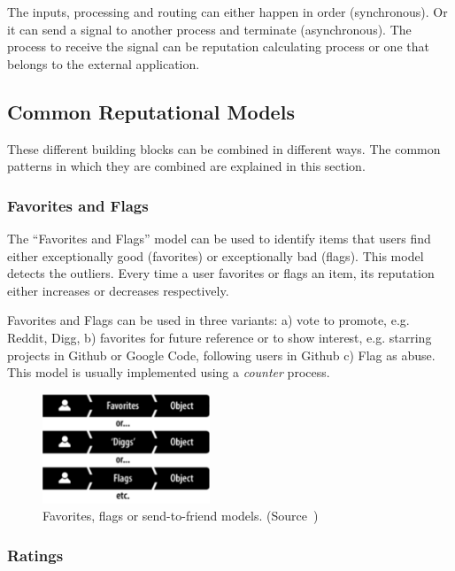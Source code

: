 The inputs, processing and routing can either happen in order (synchronous). Or it can send a signal to another process and terminate (asynchronous). The process to receive the signal can be reputation calculating process or one that belongs to the external application.

\subsection{Common Reputational Models}

These different building blocks can be combined in different ways. The common patterns in which they are combined are explained in this section.

\subsubsection{Favorites and Flags}

The ``Favorites and Flags'' model can be used to identify items that users find either exceptionally good (favorites) or exceptionally bad (flags). This model detects the outliers. Every time a user favorites or flags an item, its reputation either increases or decreases respectively.

Favorites and Flags can be used in three variants: a) vote to promote, e.g. Reddit, Digg, b) favorites for future reference or to show interest, e.g. starring projects in Github or Google Code, following users in Github c) Flag as abuse. This model is usually implemented using a \emph{counter} process.

\begin{figure}[!htb]
  \centering
  \includegraphics[width=5cm]{figures/rs_model_fav_and_flags.pdf} 
  \caption{Favorites, flags or send-to-friend models. (Source~\cite{farmer2010building})}
  \label{fig:rs_model_fav_and_flags}
\end{figure}


\subsubsection{Ratings}

